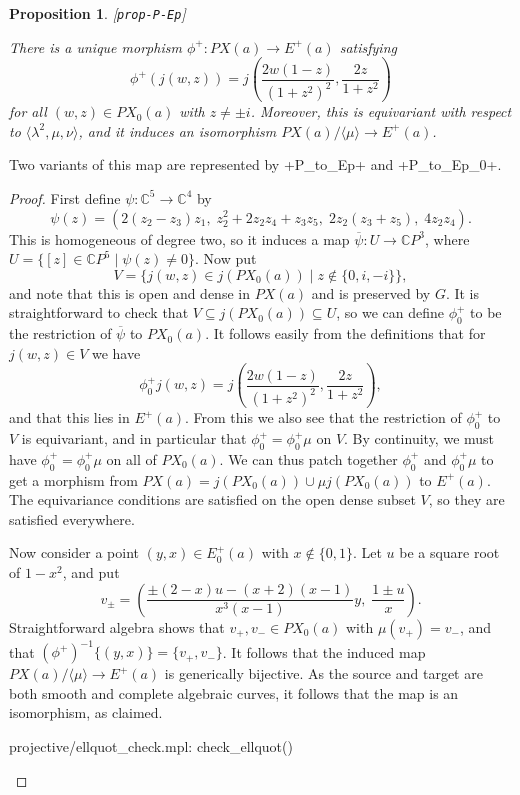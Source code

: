 \documentclass[reqno]{amsart}
\newcommand{\lbl}[1]{\label{#1}\textup{[\texttt{#1}]}\par}
\newcommand{\lbl}{\label}
\newcommand{\lm}        {\lambda}
\newcommand{\C}         {{\mathbb{C}}}
\newcommand{\ov}[1]     {\overline{#1}}
\newcommand{\ip}[1]     {\langle #1\rangle}
\newcommand{\st}        {\;|\;}
\newcommand{\sse}       {\subseteq}
\renewcommand{\:}{\colon}
\newtheorem{proposition}[theorem]{Proposition}
\theoremstyle{definition}
\begin{document}
\begin{proposition}\lbl{prop-P-Ep}
 There is a unique morphism $\phi^+\:PX(a)\to E^+(a)$ satisfying
 \[ \phi^+(j(w,z)) = j\left(\frac{2w(1-z)}{(1+z^2)^2},
                            \frac{2z}{1+z^2}\right)
 \]
 for all $(w,z)\in PX_0(a)$ with $z\neq\pm i$.  Moreover, this is
 equivariant with respect to $\ip{\lm^2,\mu,\nu}$, and it induces an
 isomorphism $PX(a)/\ip{\mu}\to E^+(a)$.
\end{proposition}
Two variants of this map are represented by \mcode+P_to_Ep+ and
\mcode+P_to_Ep_0+.
\begin{proof}
 First define $\psi\:\C^5\to\C^4$ by
 \[ \psi(z) = (2(z_2-z_3)z_1,\;z_2^2+2z_2z_4+z_3z_5,\;
               2z_2(z_3+z_5),\;4z_2z_4).
 \]
 This is homogeneous of degree two, so it induces a map
 $\ov{\psi}\:U\to\C P^3$, where $U=\{[z]\in\C P^5\st\psi(z)\neq 0\}$.
 Now put
 \[ V = \{j(w,z)\in j(PX_0(a))\st z\not\in\{0,i,-i\}\}, \]
 and note that this is open and dense in $PX(a)$ and is preserved by
 $G$.  It is straightforward to check that $V\sse j(PX_0(a))\sse U$,
 so we can define $\phi^+_0$ to be the restriction of $\ov{\psi}$ to
 $PX_0(a)$.  It follows easily from the definitions that for
 $j(w,z)\in V$ we have
 \[ \phi^+_0j(w,z) = j\left(\frac{2w(1-z)}{(1+z^2)^2},
                           \frac{2z}{1+z^2}\right),
 \]
 and that this lies in $E^+(a)$.  From this we also see that the
 restriction of $\phi^+_0$ to $V$ is equivariant, and in particular
 that $\phi^+_0=\phi^+_0\mu$ on $V$.  By continuity, we must have
 $\phi^+_0=\phi^+_0\mu$ on all of $PX_0(a)$.  We can thus patch
 together $\phi^+_0$ and $\phi^+_0\mu$ to get a morphism from
 $PX(a)=j(PX_0(a))\cup\mu j(PX_0(a))$ to $E^+(a)$.  The equivariance
 conditions are satisfied on the open dense subset $V$, so they are
 satisfied everywhere.

 Now consider a point $(y,x)\in E^+_0(a)$ with $x\not\in\{0,1\}$.  Let
 $u$ be a square root of $1-x^2$, and put
 \[ v_{\pm} = \left(
     \frac{\pm(2-x)u-(x+2)(x-1)}{x^3(x-1)}y,\;
     \frac{1\pm u}{x}
    \right).
 \]
 Straightforward algebra shows that $v_+,v_-\in PX_0(a)$ with
 $\mu(v_+)=v_-$, and that $(\phi^+)^{-1}\{(y,x)\}=\{v_+,v_-\}$.  It
 follows that the induced map $PX(a)/\ip{\mu}\to E^+(a)$ is
 generically bijective.  As the source and target are both smooth and
 complete algebraic curves, it follows that the map is an isomorphism,
 as claimed.
 \begin{checks}
  projective/ellquot_check.mpl: check_ellquot()
 \end{checks}
\end{proof}
\end{document}

